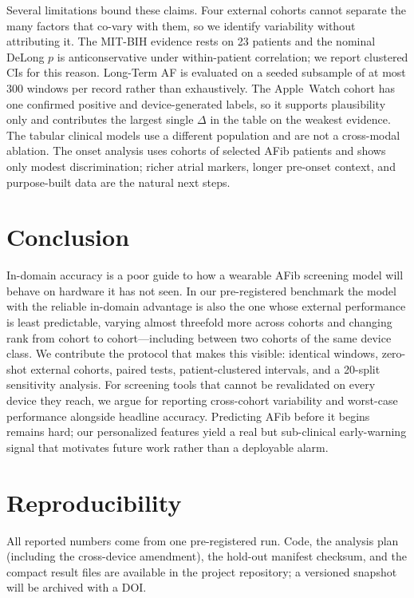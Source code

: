 \documentclass[]{ws-procs9x6}
\begin{document}
Several limitations bound these claims. Four external cohorts cannot separate the
many factors that co-vary with them, so we identify variability without
attributing it. The MIT-BIH evidence rests on 23 patients and the nominal DeLong
$p$ is anticonservative under within-patient correlation; we report clustered CIs
for this reason. Long-Term AF is evaluated on a seeded subsample of at most 300
windows per record rather than exhaustively. The Apple~Watch cohort has one
confirmed positive and device-generated labels, so it supports plausibility only
and contributes the largest single $\Delta$ in the table on the weakest evidence.
The tabular clinical models use a different population and are not a cross-modal
ablation. The onset analysis uses cohorts of selected AFib patients and shows only
modest discrimination; richer atrial markers, longer pre-onset context, and
purpose-built data are the natural next steps.

\section{Conclusion}
In-domain accuracy is a poor guide to how a wearable AFib screening model will
behave on hardware it has not seen. In our pre-registered benchmark the model with
the reliable in-domain advantage is also the one whose external performance is
least predictable, varying almost threefold more across cohorts and changing rank
from cohort to cohort---including between two cohorts of the same device class. We
contribute the protocol that makes this visible: identical windows, zero-shot
external cohorts, paired tests, patient-clustered intervals, and a 20-split
sensitivity analysis. For screening tools that cannot be revalidated on every
device they reach, we argue for reporting cross-cohort variability and worst-case
performance alongside headline accuracy. Predicting AFib before it begins remains
hard; our personalized features yield a real but sub-clinical early-warning signal
that motivates future work rather than a deployable alarm.

\section*{Reproducibility}
All reported numbers come from one pre-registered run. Code, the analysis plan
(including the cross-device amendment), the hold-out manifest checksum, and the
compact result files are available in the project repository; a versioned snapshot
will be archived with a DOI.



\end{document}
